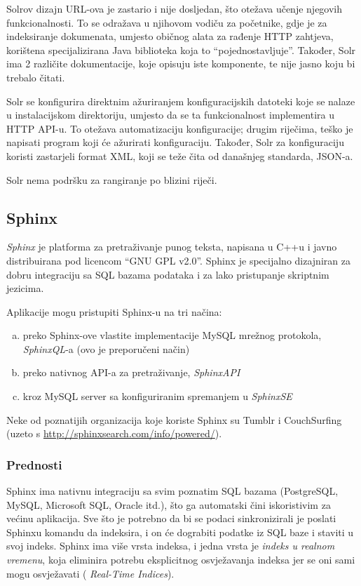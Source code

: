 \documentclass[a4paper,twoside,12pt]{scrreprt}
\begin{document}
Solrov dizajn URL-ova je zastario i nije dosljedan, što otežava učenje njegovih funkcionalnosti. To se odražava u njihovom vodiču za početnike, gdje je za indeksiranje dokumenata, umjesto običnog alata za rađenje HTTP zahtjeva, korištena specijalizirana Java biblioteka koja to ``pojednostavljuje''. Također, Solr ima 2 različite dokumentacije, koje opisuju iste komponente, te nije jasno koju bi trebalo čitati.

Solr se konfigurira direktnim ažuriranjem konfiguracijskih datoteki koje se nalaze u instalacijskom direktoriju, umjesto da se ta funkcionalnost implementira u HTTP API-u. To otežava automatizaciju konfiguracije; drugim riječima, teško je napisati program koji će ažurirati konfiguraciju. Također, Solr za konfiguraciju koristi zastarjeli format XML, koji se teže čita od današnjeg standarda, JSON-a.

Solr nema podršku za rangiranje po blizini riječi.

\subsection{Sphinx}

\textit{Sphinx} je platforma za pretraživanje punog teksta, napisana u C++u i javno distribuirana pod licencom ``GNU GPL v2.0''. Sphinx je specijalno dizajniran za dobru integraciju sa SQL bazama podataka i za lako pristupanje skriptnim jezicima.

Aplikacije mogu pristupiti Sphinx-u na tri načina:

\begin{enumerate}[(a)]
  \item preko Sphinx-ove vlastite implementacije MySQL mrežnog protokola, \textit{SphinxQL}-a (ovo je preporučeni način)
  \item preko nativnog API-a za pretraživanje, \textit{SphinxAPI}
  \item kroz MySQL server sa konfiguriranim spremanjem u \textit{SphinxSE}
\end{enumerate}

Neke od poznatijih organizacija koje koriste Sphinx su Tumblr i CouchSurfing (uzeto s \url{http://sphinxsearch.com/info/powered/}).

\subsubsection{Prednosti}

Sphinx ima nativnu integraciju sa svim poznatim SQL bazama (PostgreSQL, MySQL, Microsoft SQL, Oracle itd.), što ga automatski čini iskoristivim za većinu aplikacija. Sve što je potrebno da bi se podaci sinkronizirali je poslati Sphinxu komandu da indeksira, i on će dograbiti podatke iz SQL baze i staviti u svoj indeks. Sphinx ima više vrsta indeksa, i jedna vrsta je \textit{indeks u realnom vremenu}, koja eliminira potrebu eksplicitnog osvježavanja indeksa jer se oni sami mogu osvježavati (\cite{sphinx} \textit{Real-Time Indices}).
\end{document}
